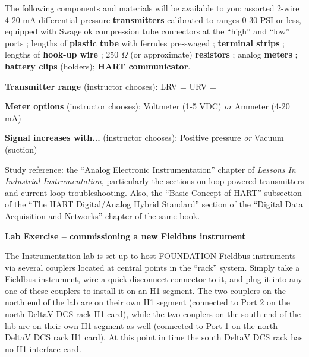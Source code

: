 \vskip 10pt

The following components and materials will be available to you: assorted 2-wire 4-20 mA differential pressure {\bf transmitters} calibrated to ranges 0-30 PSI or less, equipped with Swagelok compression tube connectors at the ``high'' and ``low'' ports ; lengths of {\bf plastic tube} with ferrules pre-swaged ; {\bf terminal strips} ; lengths of {\bf hook-up wire} ; 250 $\Omega$ (or approximate) {\bf resistors} ; analog {\bf meters} ; {\bf battery clips} (holders); {\bf HART communicator}.

\vskip 10pt

\noindent
{\bf Transmitter range} (instructor chooses): \hskip 20pt LRV = \underbar{\hskip 50pt} \hskip 20pt URV = \underbar{\hskip 50pt}

\vskip 10pt

\noindent
{\bf Meter options} (instructor chooses): \hskip 20pt \underbar{\hskip 20pt} Voltmeter (1-5 VDC) \hskip 10pt {\it or} \hskip 10pt \underbar{\hskip 20pt} Ammeter (4-20 mA)

\vskip 10pt

\noindent
{\bf Signal increases with...} (instructor chooses): \hskip 20pt \underbar{\hskip 20pt} Positive pressure \hskip 10pt {\it or} \hskip 10pt \underbar{\hskip 20pt} Vacuum (suction)

\vskip 10pt

\vfil

Study reference: the ``Analog Electronic Instrumentation'' chapter of {\it Lessons In Industrial Instrumentation}, particularly the sections on loop-powered transmitters and current loop troubleshooting.  Also, the ``Basic Concept of HART'' subsection of the ``The HART Digital/Analog Hybrid Standard'' section of the ``Digital Data Acquisition and Networks'' chapter of the same book.





\vfil \eject

\noindent
{\bf Lab Exercise -- commissioning a new Fieldbus instrument}

\vskip 5pt

The Instrumentation lab is set up to host FOUNDATION Fieldbus instruments via several couplers located at central points in the ``rack'' system.  Simply take a Fieldbus instrument, wire a quick-disconnect connector to it, and plug it into any one of these couplers to install it on an H1 segment.  The two couplers on the north end of the lab are on their own H1 segment (connected to Port 2 on the north DeltaV DCS rack H1 card), while the two couplers on the south end of the lab are on their own H1 segment as well (connected to Port 1 on the north DeltaV DCS rack H1 card).  At this point in time the south DeltaV DCS rack has no H1 interface card.

